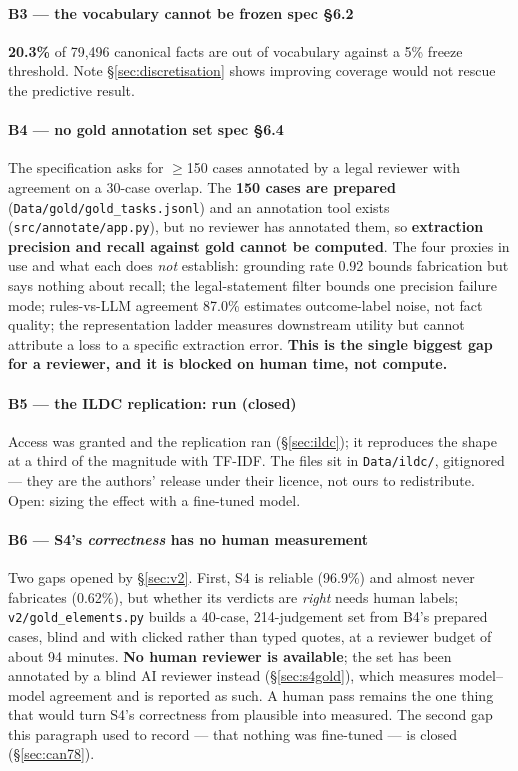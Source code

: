 \documentclass[12pt,a4paper]{article}
\newcommand{\code}[1]{\texttt{\small #1}}
\newcommand{\spec}[1]{\textbf{spec §#1}}
\begin{document}
\paragraph{B3 --- the vocabulary cannot be frozen \spec{6.2}} \textbf{20.3\%} of 79,496 canonical
facts are out of vocabulary against a 5\% freeze threshold. Note §\ref{sec:discretisation} shows
improving coverage would not rescue the predictive result.

\paragraph{B4 --- no gold annotation set \spec{6.4}} The specification asks for $\geq$150 cases
annotated by a legal reviewer with agreement on a 30-case overlap. The \textbf{150 cases are
prepared} (\code{Data/gold/gold\_tasks.jsonl}) and an annotation tool exists
(\code{src/annotate/app.py}), but no reviewer has annotated them, so \textbf{extraction precision and
recall against gold cannot be computed}. The four proxies in use and what each does \emph{not}
establish: grounding rate 0.92 bounds fabrication but says nothing about recall; the legal-statement
filter bounds one precision failure mode; rules-vs-LLM agreement 87.0\% estimates outcome-label
noise, not fact quality; the representation ladder measures downstream utility but cannot attribute a
loss to a specific extraction error. \textbf{This is the single biggest gap for a reviewer, and it is
blocked on human time, not compute.}

\paragraph{B5 --- the ILDC replication: run (closed)} Access was granted and the replication ran
(§\ref{sec:ildc}); it reproduces the shape at a third of the magnitude with TF-IDF. The files sit in
\code{Data/ildc/}, gitignored --- they are the authors' release under their licence, not ours to
redistribute. Open: sizing the effect with a fine-tuned model.

\paragraph{B6 --- S4's \emph{correctness} has no human measurement} Two gaps
opened by §\ref{sec:v2}. First, S4 is reliable (96.9\%) and almost never fabricates (0.62\%), but
whether its verdicts are \emph{right} needs human labels; \code{v2/gold\_elements.py} builds a
40-case, 214-judgement set from B4's prepared cases, blind and with clicked rather than typed quotes,
at a reviewer budget of about 94 minutes. \textbf{No human reviewer is available}; the set has been
annotated by a blind AI reviewer instead (§\ref{sec:s4gold}), which measures model--model agreement
and is reported as such. A human pass remains the one thing that would turn S4's correctness from
plausible into measured. The second gap this paragraph used to record --- that nothing was
fine-tuned --- is closed (§\ref{sec:can78}).
\end{document}
